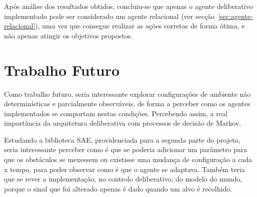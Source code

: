 Após análise dos resultados obtidos, concluiu-se que apenas o agente deliberativo implementado pode ser considerado um agente relacional (ver secção~\ref{sec:agente-relacional}), uma vez que consegue realizar as ações corretas de forma ótima, e não apenas atingir os objetivos propostos.

\section{Trabalho Futuro}\label{sec:trabalho-futuro}

Como trabalho futuro, seria interessante explorar configurações de ambiente não determinísticas e parcialmente observáveis, de forma a perceber como os agentes implementados se comportam nestas condições.
Percebendo assim, a real importância da arquitetura deliberativa com processos de decisão de Markov.

Estudando a biblioteca SAE, providenciada para a segunda parte do projeto, seria interessante perceber como é que se poderia adicionar um parâmetro para que os obstáculos se mexessem ou existisse uma mudança de configuração a cada x tempo, para poder observar como é que o agente se adaptava.
Também teria que se rever a implementação, no controlo deliberativo, do modelo do mundo, porque o sinal que foi alterado apenas é dado quando um alvo é recolhido.
